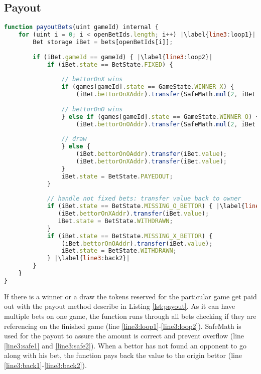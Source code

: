 \subsection{Payout}\label{subsec:payout}
\begin{lstlisting}[caption={Payout Function on the Smart Contract}, label={lst:payout},language=JavaScript,escapechar=|]
function payoutBets(uint gameId) internal {
	for (uint i = 0; i < openBetIds.length; i++) |\label{line3:loop1}|
		Bet storage iBet = bets[openBetIds[i]];
   
		if (iBet.gameId == gameId) { |\label{line3:loop2}|
			if (iBet.state == BetState.FIXED) {
   
				// bettorOnX wins
				if (games[gameId].state == GameState.WINNER_X) {
					(iBet.bettorOnXAddr).transfer(SafeMath.mul(2, iBet.value)); |\label{line3:safe1}|
   
				// bettorOnO wins
				} else if (games[gameId].state == GameState.WINNER_O) {
					(iBet.bettorOnOAddr).transfer(SafeMath.mul(2, iBet.value)); |\label{line3:safe2}|
   
				// draw
				} else {
					(iBet.bettorOnOAddr).transfer(iBet.value);
					(iBet.bettorOnXAddr).transfer(iBet.value);
				}
				iBet.state = BetState.PAYEDOUT;
			}
   
			// handle not fixed bets: transfer value back to owner
			if (iBet.state == BetState.MISSING_O_BETTOR) { |\label{line3:back1}|
			   (iBet.bettorOnXAddr).transfer(iBet.value);
			   iBet.state = BetState.WITHDRAWN;
			}
			if (iBet.state == BetState.MISSING_X_BETTOR) {
				(iBet.bettorOnOAddr).transfer(iBet.value);
				iBet.state = BetState.WITHDRAWN;
			} |\label{line3:back2}|
		}
	}
}
\end{lstlisting}
If there is a winner or a draw the tokens reserved for the particular game get paid out with the payout method describe in Listing \ref{lst:payout}. As it can have multiple bets on one game, the function runs through all bets checking if they are referencing on the finished game (line \ref{line3:loop1}-\ref{line3:loop2}). SafeMath is used for the payout to assure the amount is correct and prevent overflow (line \ref{line3:safe1} and \ref{line3:safe2}). When a bettor has not found an opponent to go along with his bet, the function pays back the value to the origin bettor (line \ref{line3:back1}-\ref{line3:back2}). 